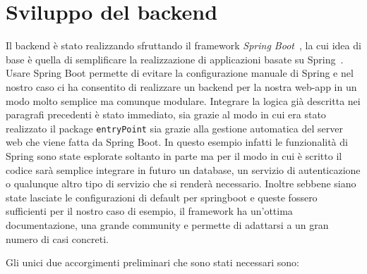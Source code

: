 \section{Sviluppo del backend}
Il backend è stato realizzando sfruttando il framework \emph{Spring Boot}~\cite{springboot}, la cui idea di base è quella di semplificare la realizzazione di applicazioni basate su Spring~\cite{spring}. Usare Spring Boot permette di evitare la configurazione manuale di Spring e nel nostro caso ci ha consentito di realizzare un backend per la nostra web-app in un modo molto semplice ma comunque modulare. Integrare la logica già descritta nei paragrafi precedenti è stato immediato, sia grazie al modo in cui era stato realizzato il package \texttt{entryPoint} sia grazie alla gestione automatica del server web che viene fatta da Spring Boot. In questo esempio infatti le funzionalità di Spring sono state esplorate soltanto in parte ma per il modo in cui è scritto il codice sarà semplice integrare in futuro un database, un servizio di autenticazione o qualunque altro tipo di servizio che si renderà necessario. Inoltre sebbene siano state lasciate le configurazioni di default per springboot e queste fossero sufficienti per il nostro caso di esempio, il framework ha un'ottima documentazione, una grande community e permette di adattarsi a un gran numero di casi concreti.\par
Gli unici due accorgimenti preliminari che sono stati necessari sono:
